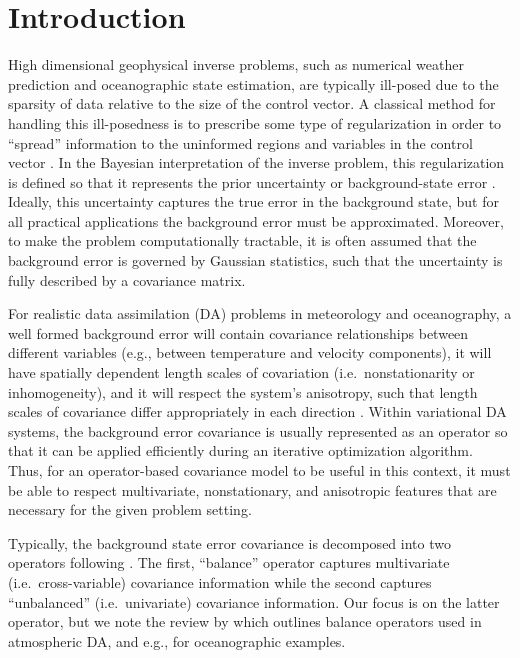 \section{Introduction}
\label{sec:intro}

High dimensional geophysical inverse problems,
such as numerical weather prediction and
oceanographic state estimation, are typically ill-posed due to the
sparsity of data relative to the size of the control vector.
A classical method for handling this ill-posedness is to prescribe
some type of regularization in order to ``spread'' information to the uninformed
regions and variables in the control vector \citep[e.g.,][]{wunsch_discrete_2006}.
In the Bayesian interpretation of the inverse problem, this regularization
is defined so that it represents the prior uncertainty or background-state error
\citep[e.g.,][]{bui-thanh_computational_2013}.
Ideally, this uncertainty captures the true error in the background state, but
for all practical applications the background error must be
approximated.
Moreover, to make the problem computationally tractable, it is often assumed
that the background error is governed by Gaussian statistics, such that the
uncertainty is fully described by a covariance matrix.

For realistic data assimilation (DA) problems in meteorology and
oceanography, a well formed background error will contain covariance relationships between
different variables (e.g., between temperature and velocity components),
it will have spatially dependent length scales of covariation
(i.e.\ nonstationarity or inhomogeneity),
and it will respect the system's anisotropy, such that length scales of covariance differ
appropriately in each direction \citep[e.g.,][]{bannister_review_2008-1}.
Within variational DA systems, the background error covariance is
usually represented as an operator so that it can be applied efficiently during
an iterative optimization algorithm.
Thus, for an operator-based covariance model to be useful in this context, it must be
able to respect multivariate, nonstationary, and anisotropic features that are
necessary for the given problem setting.

Typically, the background state error covariance is decomposed into two
operators following \citet{derber_reformulation_1999}.
The first, ``balance'' operator captures multivariate (i.e.\ cross-variable)
covariance information while the second captures ``unbalanced'' (i.e.\
univariate) covariance information.
Our focus is on the latter operator, but we note the review by
\citet{bannister_review_2008-2} which outlines balance operators used in
atmospheric DA, and e.g., \citet{weaver_multivariate_2005,moore_regional_2011-1} for oceanographic
examples.

